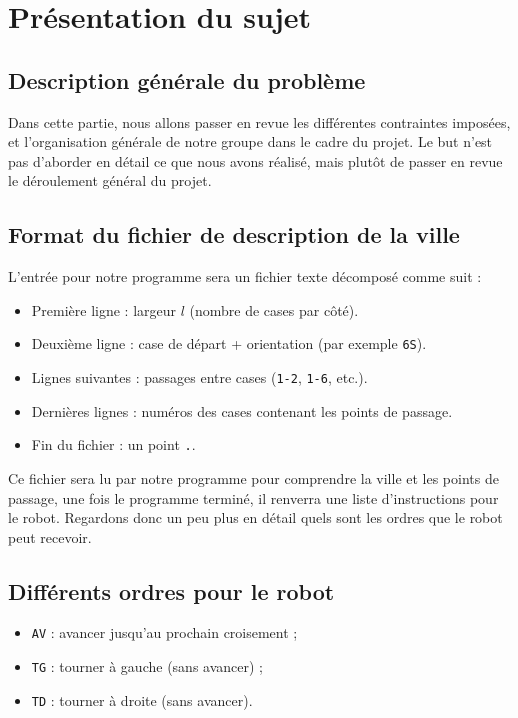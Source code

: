 \chapter{Présentation du sujet}

\section{Description générale du problème}
Dans cette partie, nous allons passer en revue les différentes contraintes imposées, et l'organisation générale de notre groupe dans le cadre du projet. Le but n'est pas d'aborder en détail ce que nous avons réalisé, mais plutôt de passer en revue le déroulement général du projet.


\section{Format du fichier de description de la ville}
L'entrée pour notre programme sera un fichier texte décomposé comme suit :
\begin{itemize}
    \item Première ligne : largeur $l$ (nombre de cases par côté).
    \item Deuxième ligne : case de départ + orientation (par exemple \texttt{6S}).
    \item Lignes suivantes : passages entre cases (\texttt{1-2}, \texttt{1-6}, etc.).
    \item Dernières lignes : numéros des cases contenant les points de passage.
    \item Fin du fichier : un point \texttt{.}.
\end{itemize}

\hspace{1cm}

\noindent Ce fichier sera lu par notre programme pour comprendre la ville et les points de passage, une fois le programme terminé, il renverra une liste d'instructions pour le robot. Regardons donc un peu plus en détail quels sont les ordres que le robot peut recevoir.

\section{Différents ordres pour le robot}
\begin{itemize}
    \item \texttt{AV} : avancer jusqu'au prochain croisement ;
    \item \texttt{TG} : tourner à gauche (sans avancer) ;
    \item \texttt{TD} : tourner à droite (sans avancer).
\end{itemize}

